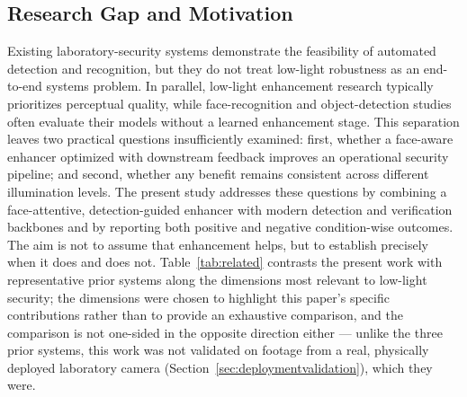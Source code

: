 \documentclass[conference]{IEEEtran}
\begin{document}
\subsection{Research Gap and Motivation}
Existing laboratory-security systems demonstrate the feasibility
of automated detection and recognition, but they do not treat
low-light robustness as an end-to-end systems problem. In parallel,
low-light enhancement research typically prioritizes perceptual
quality, while face-recognition and object-detection studies often
evaluate their models without a learned enhancement stage. This
separation leaves two practical questions insufficiently examined:
first, whether a face-aware enhancer optimized with downstream
feedback improves an operational security pipeline; and second,
whether any benefit remains consistent across different illumination
levels. The present study addresses these questions by combining a
face-attentive, detection-guided enhancer with modern detection and
verification backbones and by reporting both positive and negative
condition-wise outcomes. The aim is not to assume that enhancement
helps, but to establish precisely when it does and does not.
Table~\ref{tab:related} contrasts the present work with
representative prior systems along the dimensions most relevant
to low-light security; the dimensions were chosen to highlight
this paper's specific contributions rather than to provide an
exhaustive comparison, and the comparison is not one-sided in the
opposite direction either --- unlike the three prior systems, this
work was not validated on footage from a real, physically deployed
laboratory camera (Section~\ref{sec:deploymentvalidation}), which
they were.

\begin{table}[!t]
\caption{Positioning Relative to Prior Work}
\label{tab:related}
\centering
{}
\end{table}
\end{document}
